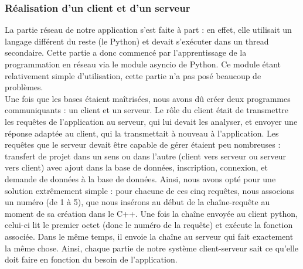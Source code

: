 \documentclass{report}
\begin{document}
\subsubsection{Réalisation d'un client et d'un serveur}
La partie réseau de notre application s'est faite à part : en effet, elle utilisait un langage différent du reste (le Python) et devait s'exécuter dans un thread secondaire. Cette partie a donc commencé par l'apprentissage de la programmation en réseau via le module asyncio de Python. Ce module étant relativement simple d'utilisation, cette partie n'a pas posé beaucoup de problèmes. \\
Une fois que les bases étaient maîtrisées, nous avons dû créer deux programmes communiquants : un client et un serveur. Le rôle du client était de transmettre les requêtes de l'application au serveur, qui lui devait les analyser, et envoyer une réponse adaptée au client, qui la transmettait à nouveau à l'application. Les requêtes que le serveur devait être capable de gérer étaient peu nombreuses : transfert de projet dans un sens ou dans l'autre (client vers serveur ou serveur vers client) avec ajout dans la base de données, inscription, connexion, et demande de données à la base de données. Ainsi, nous avons opté pour une solution extrêmement simple : pour chacune de ces cinq requêtes, nous associons un numéro (de 1 à 5), que nous insérons au début de la chaîne-requête au moment de sa création dans le C++. Une fois la chaîne envoyée au client python, celui-ci lit le premier octet (donc le numéro de la requête) et exécute la fonction associée. Dans le même temps, il envoie la chaîne au serveur qui fait exactement la même chose. Ainsi, chaque partie de notre système client-serveur sait ce qu'elle doit faire en fonction du besoin de l'application.
\end{document}
